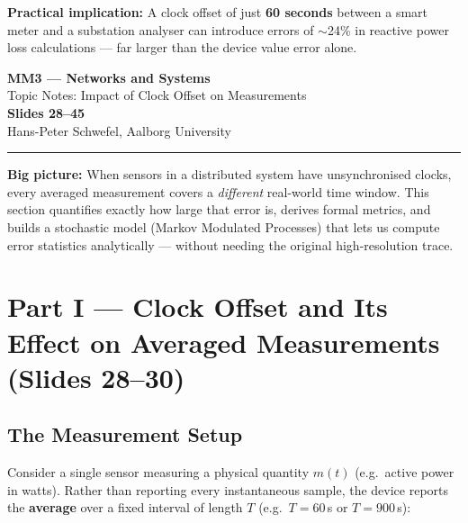 \vspace{1em}
\begin{notebox}
\textbf{Practical implication:} A clock offset of just
\textbf{60 seconds} between a smart meter and a substation
analyser can introduce errors of $\sim$24\% in reactive power
loss calculations --- far larger than the device value error
alone.
\end{notebox}

\begin{center}
  {\LARGE\bfseries\color{aaublue}
    MM3 --- Networks and Systems}\\[0.4em]
  {\large\color{accentgray}
    Topic Notes: Impact of Clock Offset on Measurements}\\[0.2em]
  {\large\bfseries Slides 28--45}\\[0.3em]
  {\small\color{accentgray}
    Hans-Peter Schwefel, Aalborg University}
\end{center}
 
\vspace{0.5em}\hrule\vspace{1em}
 
\begin{summarybox}
\textbf{Big picture:} When sensors in a distributed system have
unsynchronised clocks, every averaged measurement covers a
\emph{different} real-world time window. This section quantifies
exactly how large that error is, derives formal metrics, and
builds a stochastic model (Markov Modulated Processes) that lets
us compute error statistics analytically --- without needing the
original high-resolution trace.
\end{summarybox}
 
\section{Part I --- Clock Offset and Its Effect on Averaged
Measurements (Slides 28--30)}
 
\subsection{The Measurement Setup}
 
Consider a single sensor measuring a physical quantity $m(t)$
(e.g.\ active power in watts). Rather than reporting every
instantaneous sample, the device reports the \textbf{average}
over a fixed interval of length $T$ (e.g.\ $T = 60$\,s or
$T = 900$\,s):
 
